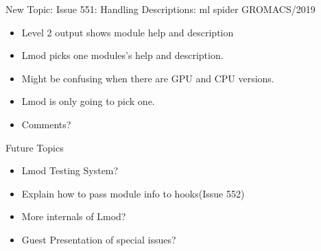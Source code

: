 \documentclass{beamer}
\begin{document}
\begin{frame}{New Topic: Issue 551: Handling Descriptions: ml spider GROMACS/2019}
  \begin{itemize}
    \item Level 2 output shows module help and description
    \item Lmod picks one modules's help and description.
    \item Might be confusing when there are GPU and CPU versions.
    \item Lmod is only going to pick one.
    \item Comments?
  \end{itemize}
\end{frame}

\begin{frame}{Future Topics}
  \begin{itemize}
    \item Lmod Testing System?
    \item Explain how to pass module info to hooks(Issue 552)
    \item More internals of Lmod?
    \item Guest Presentation of special issues?
  \end{itemize}
\end{frame}
\end{document}
